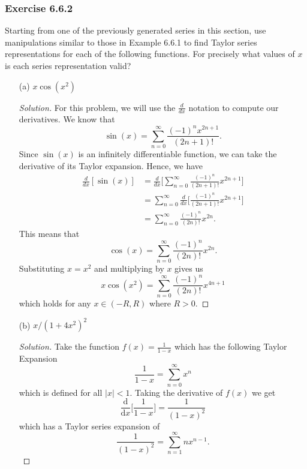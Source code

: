 \subsubsection{Exercise 6.6.2} Starting from one of the previously generated series in this section, use manipulations similar to those in Example 6.6.1 to find Taylor series representations for each of the following functions. For precisely what values of \( x \) is each series representation valid? 
\begin{enumerate}
    \item[(a)] \( x \cos(x^2)  \)
        \begin{proof}[Solution]
        For this problem, we will use the \( \frac{ d }{ dx }  \) notation to compute our derivatives. We know that 
        \[  \sin (x) = \sum_{ n=0 }^{ \infty  } \frac{ (-1)^n x^{2n+1} }{ (2n+1)! }.\]
        Since \( \sin(x)  \) is an infinitely differentiable function, we can take the derivative of its Taylor expansion. Hence, we have 
        \begin{align*}
            \frac{d  }{d x } [ \sin(x) ] &= \frac{d  }{d x } \Big[ \sum_{ n=0 }^{ \infty  } \frac{ (-1)^{n}  }{ (2n+1)! } x^{2n+1} \Big] \\
                                         &= \sum_{ n=0  }^{ \infty  } \frac{d  }{d x }  \Big[  \frac{ (-1)^{n}  }{ (2n+1)! } x^{2n+1}\Big] \\
                                         &= \sum_{ n=0  }^{ \infty  } \frac{ (-1)^n }{ (2n)! }  x^{2n}.
        \end{align*}
        This means that 
        \[  \cos(x) = \sum_{ n=0  }^{ \infty  } \frac{ (-1)^n  }{ (2n)! } x^{2n}. \] Substituting \( x = x^2  \) and multiplying by \( x  \) gives us 
        \[  x \cos(x^2) = \sum_{ n=0  }^{ \infty  } \frac{ (-1)^{n} }{ (2n)! } x^{4n+1} \]
        which holds for any \( x \in (-R ,R ) \) where \( R > 0  \).
        \end{proof}
    \item[(b)] \( x / (1+ 4x^2)^2 \)
        \begin{proof}[Solution]
        Take the function \( f(x) = \frac{ 1 }{ 1 - x  }  \) which has the following Taylor Expansion 
        \[  \frac{ 1 }{ 1 - x  } = \sum_{ n=0  }^{ \infty  } x^n  \] which is defined for all \( | x  |  < 1  \). Taking the derivative of \( f(x)  \) we get 
        \[  \frac{\text{d}  }{\text{d} x }  \Big[ \frac{ 1 }{ 1 - x  }    \Big] =  \frac{ 1   }{ (1 - x )^2  }   \]
        which has a Taylor series expansion of 
        \[  \frac{ 1 }{ (1-x)^2 } = \sum_{ n=1 }^{ \infty  } n x^{n-1} .  \]

\end{proof}
\end{enumerate}
